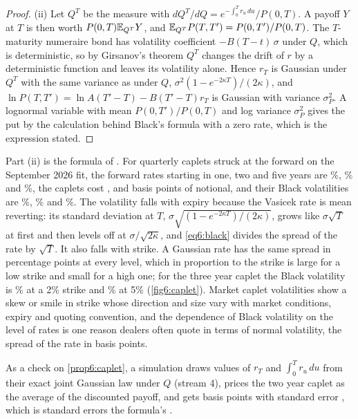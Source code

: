 \begin{chapterrefs}
\begin{proof}
(ii) Let $Q^T$ be the measure with $dQ^T/dQ=e^{-\int_0^Tr_u\,du}/P(0,T)$. A payoff $Y$ at $T$ is
then worth $P(0,T)\mathbb{E}_{Q^T}Y$, and $\mathbb{E}_{Q^T}P(T,T')=P(0,T')/P(0,T)$. The $T$-maturity numeraire bond has
volatility coefficient $-B(T-t)\,\sigma$ under $Q$, which is deterministic, so by Girsanov's theorem $Q^T$ changes the drift of $r$ by a
deterministic function and leaves its volatility alone. Hence $r_T$ is Gaussian under $Q^T$ with the
same variance as under $Q$, $\sigma^2(1-e^{-2\kappa T})/(2\kappa)$, and
$\ln P(T,T')=\ln A(T'-T)-B(T'-T)r_T$ is Gaussian with variance $\sigma_P^2$. A lognormal variable with
mean $P(0,T')/P(0,T)$ and log variance $\sigma_P^2$ gives the put by the calculation behind Black's
formula with a zero rate, which is the expression stated.
\end{proof}

Part (ii) is the formula of \textcite{jamshidian1989}. For quarterly caplets struck at the forward on
the September 2026 fit, the forward rates starting in one, two and five years are \cpFOne\%,
\cpFTwo\% and \cpFFive\%, the caplets cost \cpAtmOne, \cpAtmTwo{} and \cpAtmFive{} basis points of
notional, and their Black volatilities are \cpVolOne\%, \cpVolTwo\% and \cpVolFive\%. The volatility
falls with expiry because the Vasicek rate is mean reverting: its standard deviation at $T$,
$\sigma\sqrt{(1-e^{-2\kappa T})/(2\kappa)}$, grows like $\sigma\sqrt T$ at first and then levels off
at $\sigma/\sqrt{2\kappa}$, and \cref{eq6:black} divides the spread of the rate by $\sqrt T$. It also
falls with strike. A Gaussian rate has the same spread in percentage points at every level, which in
proportion to the strike is large for a low strike and small for a high one; for the three year
caplet the Black volatility is \cpSkewLo\% at a 2\% strike and \cpSkewHi\% at 5\% (\cref{fig6:caplet}).
Market caplet volatilities show a skew or smile in strike whose direction and size vary with market
conditions, expiry and quoting convention, and the dependence of Black volatility on the level of
rates is one reason dealers often quote in
terms of normal volatility, the spread of the rate in basis points.

As a check on \cref{prop6:caplet}, a simulation draws \cpMcPaths{} values of $r_T$ and
$\int_0^Tr_u\,du$ from their exact joint Gaussian law under $Q$ (stream 4), prices the two year
caplet as the average of the discounted payoff, and gets \cpMc{} basis points with standard error
\cpMcSE, which is \cpMcZabs{} standard errors \cpMcDir{} the formula's \cpMcExact.


\end{chapterrefs}

